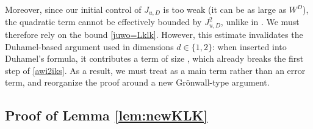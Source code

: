 \begin{remark}
Moreover, since our initial control of $J_{u,D}$ is too weak (it can be as large as $W^D$), the quadratic term  cannot be effectively bounded by $J_{u,D}^2$, unlike in \cite{YY_25,DYYY25,erdHos2025zigzag}. We must therefore rely on the bound \eqref{juwo=Lklk}. However, this estimate invalidates the Duhamel-based argument used in dimensions $d\in\{1,2\}$: when inserted into Duhamel's formula, it contributes a term of size , which already breaks the first step of \eqref{awi2iks}. As a result, we must treat  as a main term rather than an error term, and reorganize the proof around a new Gr{\"o}nwall-type argument.

\end{remark}





\subsection{Proof of Lemma \ref{lem:newKLK}}\label{subsec:pf_lem:newKLK}

